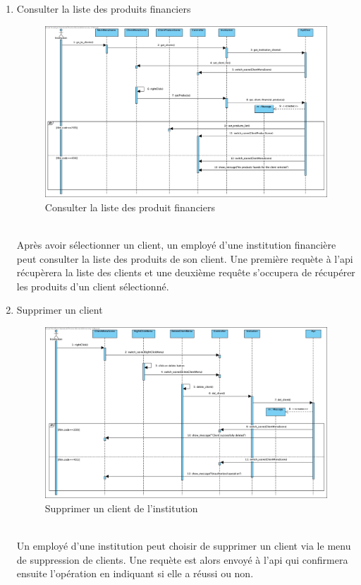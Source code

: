\documentclass[../rapport.tex]{subfiles}
\begin{document}
\begin{enumerate}
	\item{Consulter la liste des produits financiers}\\
		\begin{figure}[h]
			\centering\includegraphics[scale=0.25]{ressources/photos_diagrammes/app2/sequences2/consulterListeproduits.jpg}
			\caption{Consulter la liste des produit financiers}
		\end{figure}\\
Après avoir sélectionner un client, un employé d'une institution financière peut consulter la liste des produits de son client. Une première requète à l'api récupèrera la liste des clients et une deuxième requête s'occupera de récupérer les produits d'un client sélectionné.

	\item{Supprimer un client}
		\begin{figure}[h]
			\centering\includegraphics[scale=0.25]{ressources/photos_diagrammes/app2/sequences2/supprimerClient.jpg}
			\caption{Supprimer un client de l'institution}
		\end{figure}\\
Un employé d'une institution peut choisir de supprimer un client via le menu de suppression de clients. Une requète est alors envoyé à l'api qui confirmera ensuite l'opération en indiquant si elle a réussi ou non.
\end{enumerate}
\end{document}
